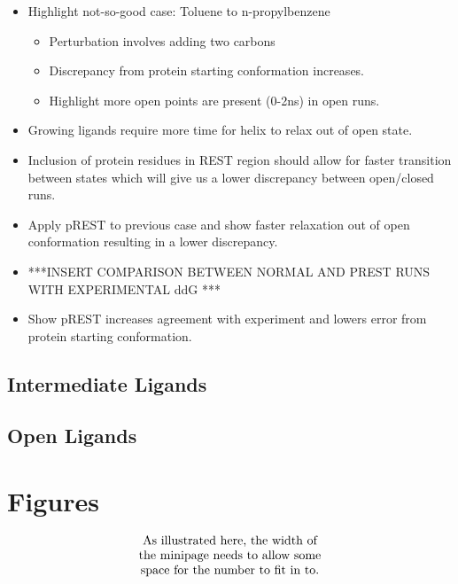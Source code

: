 \documentclass[journal=jctcce,manuscript=article]{achemso}
\begin{document}
\begin{suppinfo}
\begin{itemize}
   \item Highlight not-so-good case: Toluene to n-propylbenzene
      \begin{itemize}
      \item Perturbation involves adding two carbons
      \item Discrepancy from protein starting conformation increases.
      \item Highlight more open points are present (0-2ns) in open runs.
      \end{itemize}
   \item Growing ligands require more time for helix to relax out of open state.
   \item Inclusion of protein residues in REST region should allow for faster transition between states which will give us a lower discrepancy between open/closed runs.
   \item Apply pREST to previous case and show faster relaxation out of open conformation resulting in a lower discrepancy.
   \item ***INSERT COMPARISON BETWEEN NORMAL AND PREST RUNS WITH EXPERIMENTAL ddG ***
   \item Show pREST increases agreement with experiment and lowers error from protein starting conformation.
   \end{itemize}

\subsection{Intermediate Ligands}

\subsection{Open Ligands}

\end{suppinfo}

\section{Figures}
\begin{equation}
  \begin{minipage}[c]{0.80\linewidth}
    \centering
    As illustrated here, the width of \\
    the minipage needs to allow some  \\
    space for the number to fit in to.
  \end{minipage}
  \label{eqn:graphic}
\end{equation}
\end{document}
